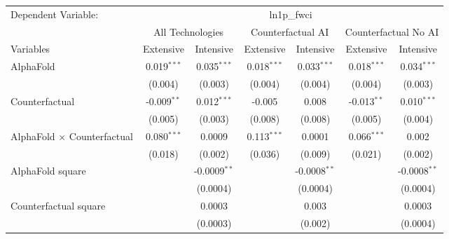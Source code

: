 \begingroup
\centering
\begin{tabular}{lcccccc}
   \tabularnewline \midrule \midrule
   Dependent Variable: & \multicolumn{6}{c}{ln1p\_fwci}\\
 & \multicolumn{2}{c}{All Technologies} & \multicolumn{2}{c}{Counterfactual AI} & \multicolumn{2}{c}{Counterfactual No AI} \\
\cmidrule(lr){1-1}\cmidrule(lr){2-3} \cmidrule(lr){4-5} \cmidrule(lr){6-7}
Variables & \multicolumn{1}{c}{Extensive} & \multicolumn{1}{c}{Intensive} & \multicolumn{1}{c}{Extensive} & \multicolumn{1}{c}{Intensive} & \multicolumn{1}{c}{Extensive} & \multicolumn{1}{c}{Intensive} \\
\cmidrule(lr){1-1}\cmidrule(lr){2-2} \cmidrule(lr){3-3} \cmidrule(lr){4-4} \cmidrule(lr){5-5} \cmidrule(lr){6-6} \cmidrule(lr){7-7}
   AlphaFold                          & 0.019$^{***}$ & 0.035$^{***}$  & 0.018$^{***}$ & 0.033$^{***}$  & 0.018$^{***}$ & 0.034$^{***}$\\   
                                      & (0.004)       & (0.003)        & (0.004)       & (0.004)        & (0.004)       & (0.003)\\   
   Counterfactual                     & -0.009$^{**}$ & 0.012$^{***}$  & -0.005        & 0.008          & -0.013$^{**}$ & 0.010$^{***}$\\   
                                      & (0.005)       & (0.003)        & (0.008)       & (0.008)        & (0.005)       & (0.004)\\   
   AlphaFold $\times$ Counterfactual  & 0.080$^{***}$ & 0.0009         & 0.113$^{***}$ & 0.0001         & 0.066$^{***}$ & 0.002\\   
                                      & (0.018)       & (0.002)        & (0.036)       & (0.009)        & (0.021)       & (0.002)\\   
   AlphaFold square                   &               & -0.0009$^{**}$ &               & -0.0008$^{**}$ &               & -0.0008$^{**}$\\   
                                      &               & (0.0004)       &               & (0.0004)       &               & (0.0004)\\   
   Counterfactual square              &               & 0.0003         &               & 0.003          &               & 0.0003\\   
                                      &               & (0.0003)       &               & (0.002)        &               & (0.0004)\\   

\end{tabular}
